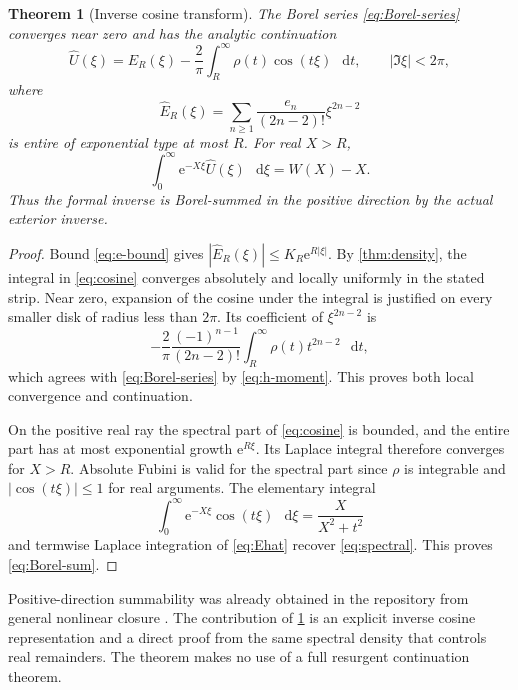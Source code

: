 \documentclass[11pt,a4paper]{article}
\newtheorem{theorem}{Theorem}[section]
\theoremstyle{definition}
\numberwithin{equation}{section}
\newcommand{\dd}{\mathop{}\!\mathrm{d}}
\newcommand{\ee}{\mathrm{e}}
\begin{document}
\begin{theorem}[Inverse cosine transform]
\label{thm:borel}
The Borel series \eqref{eq:Borel-series} converges near zero and has the analytic continuation
\begin{equation}
 \widehat U(\xi)=\widehat E_R(\xi)
              -\frac2\pi\int_R^\infty\rho(t)\cos(t\xi)\,\dd t,
 \qquad |\Im\xi|<2\pi,
 \label{eq:cosine}
\end{equation}
where
\begin{equation}
 \widehat E_R(\xi)=\sum_{n\ge1}
              \frac{e_n}{(2n-2)!}\xi^{2n-2}
 \label{eq:Ehat}
\end{equation}
is entire of exponential type at most $R$. For real $X>R$,
\begin{equation}
 \int_0^\infty\ee^{-X\xi}\widehat U(\xi)\,\dd\xi=W(X)-X.
 \label{eq:Borel-sum}
\end{equation}
Thus the formal inverse is Borel-summed in the positive direction by the actual exterior inverse.
\end{theorem}
\begin{proof}
Bound \eqref{eq:e-bound} gives
$|\widehat E_R(\xi)|\le K_R\ee^{R|\xi|}$. By \cref{thm:density}, the integral in \eqref{eq:cosine} converges absolutely and locally uniformly in the stated strip. Near zero, expansion of the cosine under the integral is justified on every smaller disk of radius less than $2\pi$. Its coefficient of $\xi^{2n-2}$ is
\[
 -\frac2\pi\frac{(-1)^{n-1}}{(2n-2)!}
                 \int_R^\infty\rho(t)t^{2n-2}\,\dd t,
\]
which agrees with \eqref{eq:Borel-series} by \eqref{eq:h-moment}. This proves both local convergence and continuation.

On the positive real ray the spectral part of \eqref{eq:cosine} is bounded, and the entire part has at most exponential growth $\ee^{R\xi}$. Its Laplace integral therefore converges for $X>R$. Absolute Fubini is valid for the spectral part since $\rho$ is integrable and $|\cos(t\xi)|\le1$ for real arguments. The elementary integral
\[
 \int_0^\infty\ee^{-X\xi}\cos(t\xi)\,\dd\xi
       =\frac{X}{X^2+t^2}
\]
and termwise Laplace integration of \eqref{eq:Ehat} recover \eqref{eq:spectral}. This proves \eqref{eq:Borel-sum}.
\end{proof}

Positive-direction summability was already obtained in the repository from general nonlinear closure \cite{prior,sauzin}. The contribution of \cref{thm:borel} is an explicit inverse cosine representation and a direct proof from the same spectral density that controls real remainders. The theorem makes no use of a full resurgent continuation theorem.
\end{document}
